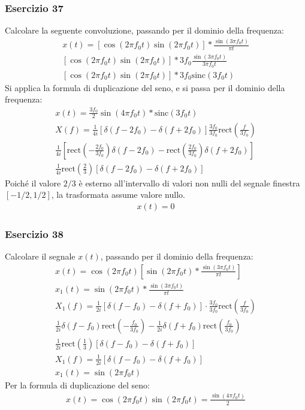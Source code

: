 \documentclass{article}
\newcommand{\rect}{\mathrm{rect}}
\newcommand{\sinc}{\mathrm{sinc}}
\begin{document}
\subsubsection*{Esercizio 37}

Calcolare la seguente convoluzione, passando per il dominio della frequenza:
\begin{gather*}
    x(t)=\left[\cos(2\pi f_0t)\sin(2\pi f_0t)\right]*\displaystyle\frac{\sin(3\pi f_0t)}{\pi t}\\
    \left[\cos(2\pi f_0t)\sin(2\pi f_0t)\right]*\displaystyle3f_0\frac{\sin(3\pi f_0t)}{3\pi f_0t}\\
    \left[\cos(2\pi f_0t)\sin(2\pi f_0t)\right]*3f_0\sinc(3f_0 t)
\end{gather*}
Si applica la formula di duplicazione del seno, e si passa per il dominio della frequenza:
\begin{gather*}
    x(t)=\displaystyle\frac{3f_0}{2}\sin(4\pi f_0t)*\sinc(3f_0t)\\
    X(f)=\displaystyle\frac{1}{4i}\left[\delta(f-2f_0)-\delta(f+2f_0)\right]\frac{3f_0}{3f_0}\rect\left(\frac{f}{3f_0}\right)\\
    \displaystyle\frac{1}{4i}\left[\rect\left(-\frac{2f_0}{3f_0}\right)\delta(f-2f_0)-\rect\left(\frac{2f_0}{3f_0}\right)\delta(f+2f_0)\right]\\
    \displaystyle\frac{1}{4i}\rect\left(\frac{2}{3}\right)\left[\delta(f-2f_0)-\delta(f+2f_0)\right]
\end{gather*}
Poiché il valore $2/3$ è esterno all'intervallo di valori non nulli del segnale finestra $[-1/2,1/2]$, la trasformata assume valore nullo. 
\begin{gather}
    x(t)=0
\end{gather}

\subsubsection*{Esercizio 38}

Calcolare il segnale $x(t)$, passando per il dominio della frequenza:
\begin{gather*}
    x(t)=\cos(2\pi f_0t)\left[\sin(2\pi f_0t)*\displaystyle\frac{\sin(3\pi f_0t)}{\pi t}\right]\\
    x_1(t)=\sin(2\pi f_0t)*\displaystyle\frac{\sin(3\pi f_0t)}{\pi t}\\
    X_1(f)=\displaystyle\frac{1}{2i}\left[\delta(f-f_0)-\delta(f+f_0)\right]\cdot \frac{3f_0}{3f_0}\rect\left(\frac{f}{3f_0}\right)\\
    \displaystyle\frac{1}{2i}\delta(f-f_0)\rect\left(-\frac{f_0}{3f_0}\right)-\frac{1}{2i}\delta(f+f_0)\rect\left(\frac{f_0}{3f_0}\right)\\
    \displaystyle\frac{1}{2i}\rect\left(\frac{1}{3}\right)\left[\delta(f-f_0)-\delta(f+f_0)\right]\\
    X_1(f)=\displaystyle\frac{1}{2i}\left[\delta(f-f_0)-\delta(f+f_0)\right]\\
    x_1(t)=\sin(2\pi f_0t)
\end{gather*}
Per la formula di duplicazione del seno: 
\begin{gather}
    x(t)=\cos(2\pi f_0t)\sin(2\pi f_0t)=\displaystyle\frac{\sin(4\pi f_0t)}{2}
\end{gather}
\end{document}
